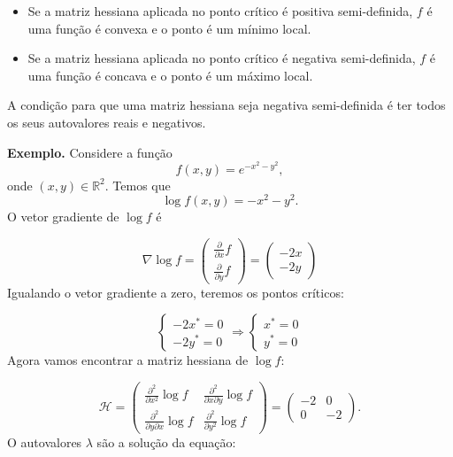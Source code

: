 \documentclass[
  letterpaper,
  DIV=11,
  numbers=noendperiod]{scrartcl}
\begin{document}
\begin{itemize}
\item
  Se a matriz hessiana aplicada no ponto crítico é positiva
  semi-definida, \(f\) é uma função é convexa e o ponto é um mínimo
  local.
\item
  Se a matriz hessiana aplicada no ponto crítico é negativa
  semi-definida, \(f\) é uma função é concava e o ponto é um máximo
  local.
\end{itemize}

A condição para que uma matriz hessiana seja negativa semi-definida é
ter todos os seus autovalores reais e negativos.

\textbf{Exemplo.} Considere a função \[f(x,y)=e^{-x^2 - y^2},\] onde
\((x,y)\in\mathbb{R}^2\). Temos que \[\log f(x,y)=-x^2 - y^2.\] O vetor
gradiente de \(\log f\) é

\[\nabla\log f=\left(\begin{array}{c}\frac{\partial}{\partial x}f \\ \frac{\partial}{\partial y}f\end{array}\right)=\left(\begin{array}{c} -2x \\ -2y\end{array}\right)\]
Igualando o vetor gradiente a zero, teremos os pontos críticos:

\[\left\{\begin{array}{c} -2x^*=0 \\ -2y^*=0\end{array}\right.\Rightarrow\left\{\begin{array}{c} x^*=0 \\ y^*=0\end{array}\right.\]
Agora vamos encontrar a matriz hessiana de \(\log f\):

\[\mathcal{H}=\left(\begin{array}{cc}\frac{\partial^2}{\partial x^2}\log f & \frac{\partial^2}{\partial x\partial y}\log f\\  \frac{\partial^2}{\partial y \partial x}\log f & \frac{\partial^2}{\partial y^2}\log f\end{array}\right)=\left(\begin{array}{cc}-2&0\\0&-2\end{array}\right).\]
O autovalores \(\lambda\) são a solução da equação:
\end{document}
